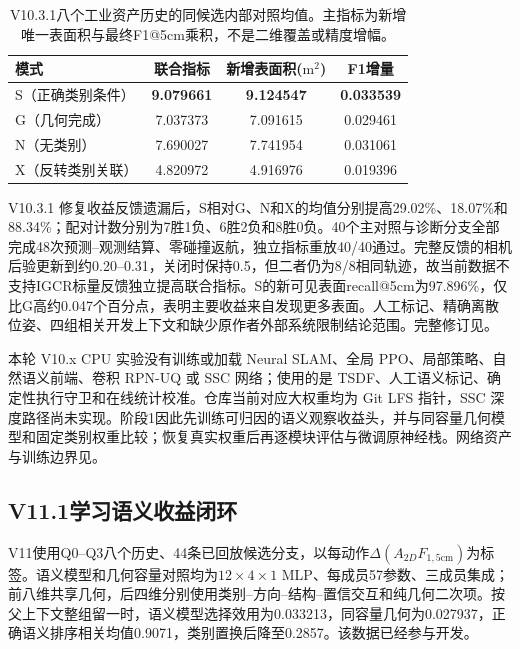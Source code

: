 \documentclass[11pt,a4paper]{article}
\begin{document}
\begin{table}[h]
\centering
\caption{V10.3.1八个工业资产历史的同候选内部对照均值。主指标为新增唯一表面积与最终F1@5cm乘积，不是二维覆盖或精度增幅。}
\begin{tabular}{lccc}
\toprule
模式 & 联合指标 & 新增表面积($\mathrm m^2$) & F1增量\\
\midrule
S（正确类别条件） & \textbf{9.079661} & \textbf{9.124547} & \textbf{0.033539}\\
G（几何完成） & 7.037373 & 7.091615 & 0.029461\\
N（无类别） & 7.690027 & 7.741954 & 0.031061\\
X（反转类别关联） & 4.820972 & 4.916976 & 0.019396\\
\bottomrule
\end{tabular}
\end{table}

V10.3.1 修复收益反馈遗漏后，S相对G、N和X的均值分别提高29.02\%、18.07\%和88.34\%；配对计数分别为7胜1负、6胜2负和8胜0负。40个主对照与诊断分支全部完成48次预测--观测结算、零碰撞返航，独立指标重放40/40通过。完整反馈的相机后验更新到约0.20--0.31，关闭时保持0.5，但二者仍为8/8相同轨迹，故当前数据不支持IGCR标量反馈独立提高联合指标。S的新可见表面recall@5cm为97.896\%，仅比G高约0.047个百分点，表明主要收益来自发现更多表面。人工标记、精确离散位姿、四组相关开发上下文和缺少原作者外部系统限制结论范围。完整修订见。

本轮 V10.x CPU 实验没有训练或加载 Neural SLAM、全局 PPO、局部策略、自然语义前端、卷积 RPN-UQ 或 SSC 网络；使用的是 TSDF、人工语义标记、确定性执行守卫和在线统计校准。仓库当前对应大权重均为 Git LFS 指针，SSC 深度路径尚未实现。阶段1因此先训练可归因的语义观察收益头，并与同容量几何模型和固定类别权重比较；恢复真实权重后再逐模块评估与微调原神经栈。网络资产与训练边界见。

\subsection{V11.1学习语义收益闭环}

V11使用Q0--Q3八个历史、44条已回放候选分支，以每动作$\Delta(A_{2D}F_{1,5\mathrm{cm}})$为标签。语义模型和几何容量对照均为$12\times4\times1$ MLP、每成员57参数、三成员集成；前八维共享几何，后四维分别使用类别--方向--结构--置信交互和纯几何二次项。按父上下文整组留一时，语义模型选择效用为0.033213，同容量几何为0.027937，正确语义排序相关均值0.9071，类别置换后降至0.2857。该数据已经参与开发。
\end{document}
